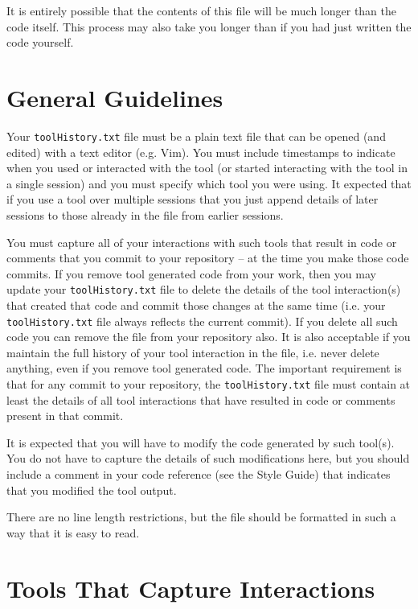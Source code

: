 \documentclass{article}
\begin{document}
It is entirely possible that the contents of this file will be much longer than the code itself. This process may also take you longer
than if you had just written the code yourself.

\section {General Guidelines}
Your \texttt{toolHistory.txt} file must be a plain text file that can be opened (and edited) with a text editor (e.g. Vim). You must include
timestamps to indicate when you used or interacted with the tool (or started interacting with the tool in a single session) and you must
specify which tool you were using. It expected that if you use a tool over multiple sessions that you just append details of later sessions
to those already in the file from earlier sessions.

You must capture all of your interactions with such tools that result in code or comments that you commit to your repository --
at the time you make those code commits. If you 
remove tool generated code from your work, then you may update your \texttt{toolHistory.txt} file to delete the details of the
tool interaction(s) that created that code and commit those changes at the same time (i.e. your \texttt{toolHistory.txt} file
always reflects the current commit). If you delete all such code you can remove the file from your repository also.
It is also acceptable if you maintain the full history of your tool interaction in the file, i.e. never delete anything, even if you 
remove tool generated code. The important requirement is that for any commit to your repository, the \texttt{toolHistory.txt} file
must contain at least the details of all tool interactions that have resulted in code or comments present in that commit.

It is expected that you will have to modify the code generated by such tool(s). You do not have to capture the details
of such modifications here, but you should include a comment in your code reference (see the Style Guide)
that indicates that you modified the tool output. 

There are no line length restrictions, but the file should be formatted in such a way that it is easy to read. 

\section{Tools That Capture Interactions}
\end{document}
